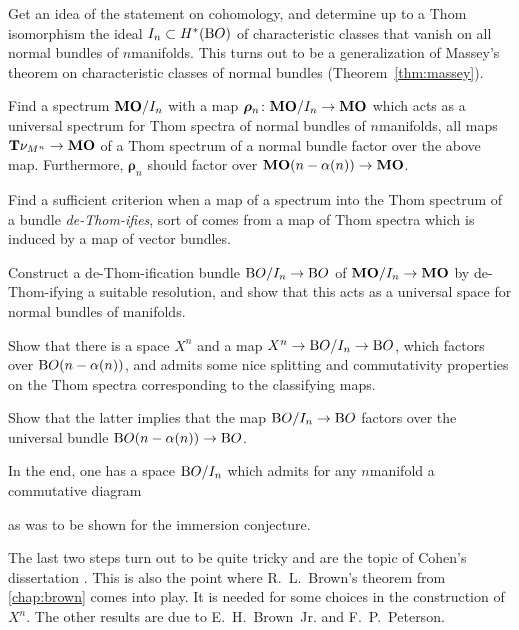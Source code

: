 \begin{steps}
\item
  Get an idea of the statement on cohomology, and determine up to a
  Thom isomorphism the ideal $I_{n}\subset H^*(\mathrm{B}O)$ of characteristic
  classes that vanish on all normal bundles of $n$\nbd{}manifolds.
  This turns out to be a generalization of Massey's theorem on
  characteristic classes of normal bundles (Theorem~\ref{thm:massey}).
\item
  Find a spectrum $\bm{\mathrm{MO}}/I_{n}$ with a map
  $\bm{\rho}_n\colon \bm{\mathrm{MO}}/I_{n}\to\bm{\mathrm{MO}}$ which acts as a universal
  spectrum for Thom spectra of normal bundles of $n$\nbd{}manifolds,
  \idest all maps $\bm{\mathrm{T}}{\nu_{M^n}}\to \bm{\mathrm{MO}}$ of a Thom spectrum of a
  normal bundle factor over the above map.
  Furthermore, $\bm{\rho}_n$ should factor
  over $\bm{\mathrm{MO}}(n-\alpha(n))\to\bm{\mathrm{MO}}$.
\item
  Find a sufficient criterion when a map of a spectrum into the Thom
  spectrum of a bundle \emph{de-Thom-ifies}, \idest sort of
  comes from a map of Thom spectra which is induced by a map
  of vector bundles.
\item
  Construct a de-Thom-ification bundle $\mathrm{B}O/I_{n}\to\mathrm{B}O$ of $\bm{\mathrm{MO}}/I_{n}\to\bm{\mathrm{MO}}$ by de-Thom-ifying a suitable resolution,
  and show that this acts as a universal space for normal
  bundles of manifolds.
\item
  Show that there is a space $X^n$ and a map
  $X^n\to\mathrm{B}O/I_{n}\to\mathrm{B}O$, which factors over $\mathrm{B}O(n-\alpha(n))$, and
  admits some nice splitting and  commutativity properties on the Thom
  spectra corresponding to the classifying maps.
\item
  Show that the latter implies that the map $\mathrm{B}O/I_{n}\to\mathrm{B}O$ factors
  over the universal bundle $\mathrm{B}O(n-\alpha(n))\to\mathrm{B}O$.
\end{steps}
In the end, one has a space $\mathrm{B}O/I_{n}$ which admits for
any $n$\nbd{}manifold a commutative diagram
\begin{center}
\end{center}
as was to be shown for the immersion conjecture.

The last two steps turn out to be quite tricky and are the topic of
Cohen's dissertation \cite{cohen}. This is also the point where
R.~L.~Brown's theorem from \autoref{chap:brown} comes into play.
It is needed for some choices in the construction of $X^n$.
The other results are due to E.~H.~Brown~Jr. and F.~P.~Peterson.

